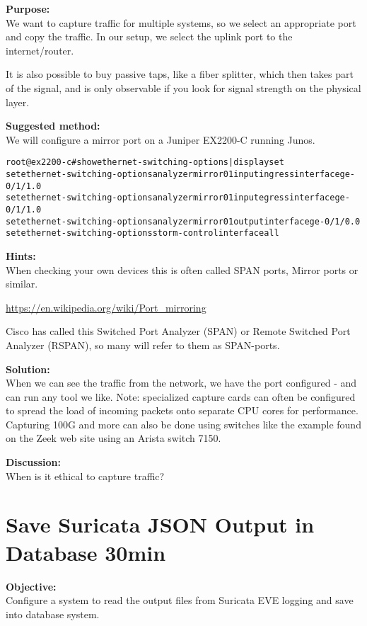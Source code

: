 \documentclass[a4paper,11pt,notitlepage]{report}
\begin{document}
{\bf Purpose:}\\
We want to capture traffic for multiple systems, so we select an appropriate port and copy the traffic. In our setup, we select the uplink port to the internet/router.

It is also possible to buy passive taps, like a fiber splitter, which then takes part of the signal, and is only observable if you look for signal strength on the physical layer.


{\bf Suggested method:}\\
We will configure a mirror port on a Juniper EX2200-C running Junos.

\begin{alltt}
root@ex2200-c# show ethernet-switching-options | display set
set ethernet-switching-options analyzer mirror01 input ingress interface ge-0/1/1.0
set ethernet-switching-options analyzer mirror01 input egress interface ge-0/1/1.0
set ethernet-switching-options analyzer mirror01 output interface ge-0/1/0.0
set ethernet-switching-options storm-control interface all
\end{alltt}


{\bf Hints:}\\
When checking your own devices this is often called SPAN ports, Mirror ports or similar.

\url{https://en.wikipedia.org/wiki/Port_mirroring}

Cisco has called this Switched Port Analyzer (SPAN) or Remote Switched Port Analyzer (RSPAN), so many will refer to them as SPAN-ports.

{\bf Solution:}\\
When we can see the traffic from the network, we have the port configured - and can run any tool we like. Note: specialized capture cards can often be configured to spread the load of incoming packets onto separate CPU cores for performance. Capturing 100G and more can also be done using switches like the example found on the Zeek web site using an Arista switch 7150.


{\bf Discussion:}\\
When is it ethical to capture traffic?


\chapter{Save Suricata JSON Output in Database 30min}
\label{ex:suricatahasboards}


{\bf Objective:} \\
Configure a system to read the output files from Suricata EVE logging and save into database system.
\end{document}
